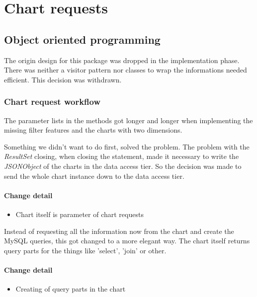 \section{Chart requests}




\subsection{Object oriented programming}
The origin design for this package was dropped in the implementation phase.
There was neither a visitor pattern nor classes to wrap the informations
needed efficient. This decision was withdrawn.

\subsubsection{Chart request workflow}
The parameter lists in the methods got longer 
and longer when implementing the missing filter features
and the charts with two dimensions.

Something we didn't want to do first, solved the problem. The problem 
with the \textit{ResultSet} closing, when closing the statement, made it
necessary to write the \textit{JSONObject} of the charts in the
data access tier. So the decision was made to send the whole chart instance
down to the data access tier. 

\paragraph{Change detail}
\begin{itemize}
  \item Chart itself is parameter of chart requests
\end{itemize}

Instead of requesting all the information now from the chart
and create the MySQL queries, this got changed to a more  elegant way.
The chart itself returns query parts for the things like 'select', 'join' or other.

\paragraph{Change detail}
\begin{itemize}
  \item Creating of query parts in the chart
\end{itemize}

